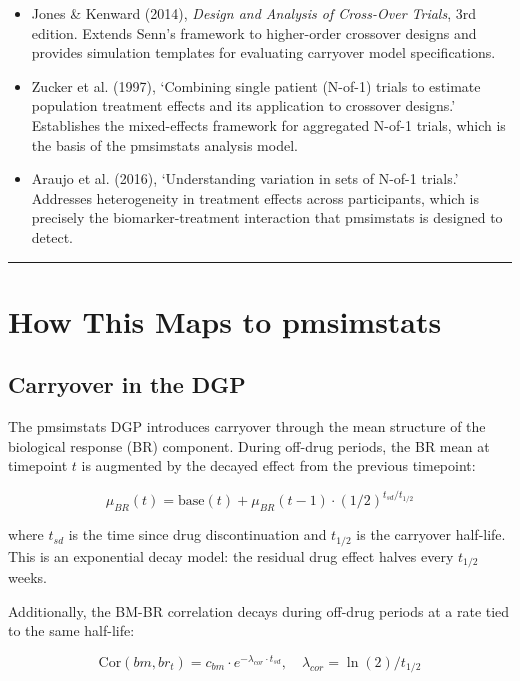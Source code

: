 \documentclass[11pt]{article}
\begin{document}
\begin{itemize}
  \item Jones \& Kenward (2014), \textit{Design and Analysis of Cross-Over
    Trials}, 3rd edition. Extends Senn's framework to higher-order
    crossover designs and provides simulation templates for
    evaluating carryover model specifications.

  \item Zucker et al. (1997), `Combining single patient (N-of-1)
    trials to estimate population treatment effects and its
    application to crossover designs.' Establishes the mixed-effects
    framework for aggregated N-of-1 trials, which is the basis of
    the pmsimstats analysis model.

  \item Araujo et al. (2016), `Understanding variation in sets of
    N-of-1 trials.' Addresses heterogeneity in treatment effects
    across participants, which is precisely the biomarker-treatment
    interaction that pmsimstats is designed to detect.
\end{itemize}

\bigskip\noindent\rule{\textwidth}{0.4pt}\bigskip

\section{How This Maps to pmsimstats}

\subsection{Carryover in the DGP}

The pmsimstats DGP introduces carryover through the mean
structure of the biological response (BR) component. During
off-drug periods, the BR mean at timepoint $t$ is augmented by
the decayed effect from the previous timepoint:

\[
\mu_{BR}(t) = \text{base}(t) + \mu_{BR}(t-1) \cdot
(1/2)^{t_{sd} / t_{1/2}}
\]

where $t_{sd}$ is the time since drug discontinuation and
$t_{1/2}$ is the carryover half-life. This is an exponential
decay model: the residual drug effect halves every $t_{1/2}$
weeks.

Additionally, the BM-BR correlation decays during off-drug
periods at a rate tied to the same half-life:

\[
\text{Cor}(bm, br_t) = c_{bm} \cdot e^{-\lambda_{cor} \cdot
t_{sd}}, \quad \lambda_{cor} = \ln(2) / t_{1/2}
\]
\end{document}
